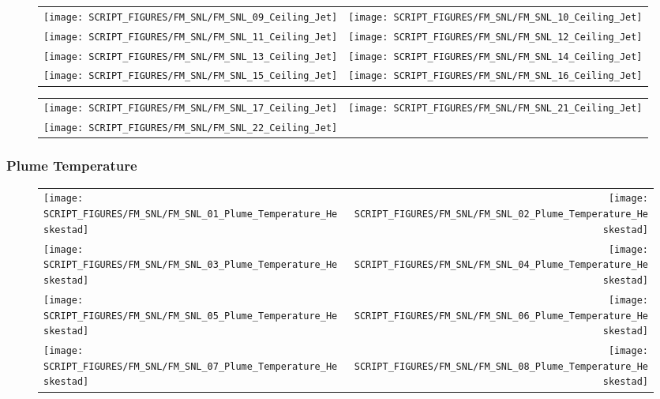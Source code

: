 \begin{figure}[p]
\begin{tabular*}{\textwidth}{l@{\extracolsep{\fill}}r}
\texttt{[image: SCRIPT\_FIGURES/FM\_SNL/FM\_SNL\_09\_Ceiling\_Jet]} &
\texttt{[image: SCRIPT\_FIGURES/FM\_SNL/FM\_SNL\_10\_Ceiling\_Jet]} \\
\texttt{[image: SCRIPT\_FIGURES/FM\_SNL/FM\_SNL\_11\_Ceiling\_Jet]} &
\texttt{[image: SCRIPT\_FIGURES/FM\_SNL/FM\_SNL\_12\_Ceiling\_Jet]} \\
\texttt{[image: SCRIPT\_FIGURES/FM\_SNL/FM\_SNL\_13\_Ceiling\_Jet]} &
\texttt{[image: SCRIPT\_FIGURES/FM\_SNL/FM\_SNL\_14\_Ceiling\_Jet]} \\
\texttt{[image: SCRIPT\_FIGURES/FM\_SNL/FM\_SNL\_15\_Ceiling\_Jet]} &
\texttt{[image: SCRIPT\_FIGURES/FM\_SNL/FM\_SNL\_16\_Ceiling\_Jet]}
\end{tabular*}
\end{figure}

\begin{figure}[p]
\begin{tabular*}{\textwidth}{l@{\extracolsep{\fill}}r}
\texttt{[image: SCRIPT\_FIGURES/FM\_SNL/FM\_SNL\_17\_Ceiling\_Jet]} &
\texttt{[image: SCRIPT\_FIGURES/FM\_SNL/FM\_SNL\_21\_Ceiling\_Jet]} \\
\texttt{[image: SCRIPT\_FIGURES/FM\_SNL/FM\_SNL\_22\_Ceiling\_Jet]}
\end{tabular*}
\end{figure}

\clearpage

\subsubsection{Plume Temperature}

\begin{figure}[p]
\begin{tabular*}{\textwidth}{l@{\extracolsep{\fill}}r}
\texttt{[image: SCRIPT\_FIGURES/FM\_SNL/FM\_SNL\_01\_Plume\_Temperature\_Heskestad]} &
\texttt{[image: SCRIPT\_FIGURES/FM\_SNL/FM\_SNL\_02\_Plume\_Temperature\_Heskestad]} \\
\texttt{[image: SCRIPT\_FIGURES/FM\_SNL/FM\_SNL\_03\_Plume\_Temperature\_Heskestad]} &
\texttt{[image: SCRIPT\_FIGURES/FM\_SNL/FM\_SNL\_04\_Plume\_Temperature\_Heskestad]} \\
\texttt{[image: SCRIPT\_FIGURES/FM\_SNL/FM\_SNL\_05\_Plume\_Temperature\_Heskestad]} &
\texttt{[image: SCRIPT\_FIGURES/FM\_SNL/FM\_SNL\_06\_Plume\_Temperature\_Heskestad]} \\
\texttt{[image: SCRIPT\_FIGURES/FM\_SNL/FM\_SNL\_07\_Plume\_Temperature\_Heskestad]} &
\texttt{[image: SCRIPT\_FIGURES/FM\_SNL/FM\_SNL\_08\_Plume\_Temperature\_Heskestad]}
\end{tabular*}
\end{figure}

